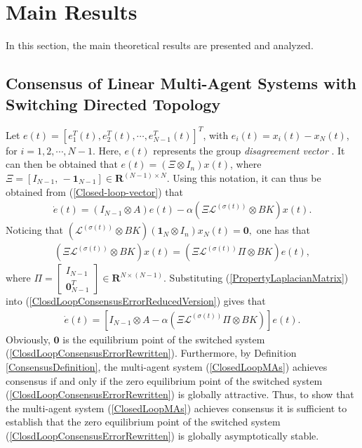 \documentclass[letterpaper, 10 pt, conference]{ieeeconf}
\begin{document}
\section{Main Results}
In this section, the main theoretical results are presented and analyzed.
\par
\subsection{Consensus of Linear Multi-Agent Systems with Switching Directed Topology}
Let $e(t)=[e_{1}^{T}(t),e_{2}^{T}(t),\cdots,e_{N-1}^{T}(t)]^{T}$, with
$e_{i}(t)=x_{i}(t)-x_{N}(t)$, for $i=1,2,\cdots,N-1$.
Here, $e(t)$ represents the group
\emph{disagreement vector} \cite{SaberMurrayTAC2005}.
It can then be
obtained that $e(t)=(\Xi\otimes I_{n})x(t)$, where
$\Xi=\left[I_{N-1},\,-\mathbf{1}_{N-1}\right]\in \mathbf{R}^{(N-1)\times
  N}$. Using this notation, it can thus be obtained from
(\ref{Closed-loop-vector}) that
\begin{eqnarray}\label{ClosdLoopConsensusErrorReducedVersion}
\dot{e}(t)=(I_{N-1}\otimes A)e(t)-\alpha\left(\Xi\mathcal{L}^{(\sigma(t))} \otimes BK\right)x(t).
\end{eqnarray}
Noticing that
$
\left(\mathcal{L}^{(\sigma(t))} \otimes BK\right)(\mathbf{1}_{N}\otimes I_{n})x_{N}(t)=\mathbf{0},
$
one has that
\begin{eqnarray}\label{PropertyLaplacianMatrix}
\left(\Xi\mathcal{L}^{(\sigma(t))} \otimes BK\right)x(t)=\left(\Xi\mathcal{L}^{(\sigma(t))}\Pi \otimes BK\right)e(t),
\end{eqnarray}
where $\Pi=\left[\begin{array}{c}
I_{N-1}\\
\mathbf{0}_{N-1}^{T}
\end{array}\right]\in \mathbf{R}^{N\times (N-1)}$. Substituting (\ref{PropertyLaplacianMatrix}) into
(\ref{ClosdLoopConsensusErrorReducedVersion}) gives that
\begin{eqnarray}\label{ClosdLoopConsensusErrorRewritten}
\dot{e}(t)=\left[I_{N-1}\otimes A-\alpha\left(\Xi\mathcal{L}^{(\sigma(t))}\Pi \otimes BK\right)\right]e(t).
\end{eqnarray}
Obviously, $\mathbf{0}$ is the equilibrium point of the switched system
(\ref{ClosdLoopConsensusErrorRewritten}). Furthermore, by Definition
\ref{ConsensusDefinition}, the multi-agent system (\ref{ClosedLoopMAs})
achieves consensus if and only if the zero equilibrium point of the switched
system (\ref{ClosdLoopConsensusErrorRewritten}) is globally
attractive. Thus,  to show that
the multi-agent system (\ref{ClosedLoopMAs}) achieves consensus it is
sufficient to establish that the zero
equilibrium point of the switched system
(\ref{ClosdLoopConsensusErrorRewritten}) is globally asymptotically
stable.
\end{document}
